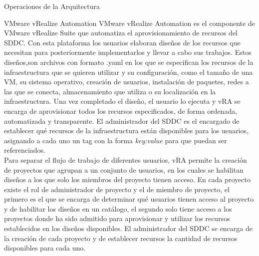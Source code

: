 \begin{subsection}{Operaciones de la Arquitectura}
    \begin{subsubsection}{VMware vRealize Automation}
        VMware vRealize Automation es el componente de VMware vRealize Suite que automatiza el aprovisionamiento de recursos del SDDC. Con esta plataforma los usuarios elaboran diseños de los recursos que necesitan para posteriormente implementarlos y llevar a cabo sus trabajos. Estos diseños,son archivos con formato .yaml en los que se especifican los recursos de la infraestructura que se quieren utilizar y su configuración, como el tamaño de una VM, su sistema operativo, creación de usuarios, instalación de paquetes, redes a las que se conecta, almacenamiento que utiliza o su localización en la infraestructura. Una vez completado el diseño, el usuario lo ejecuta y vRA se encarga de aprovisionar todos los recursos especificados, de forma ordenada, automatizada y transparente. El administrador del SDDC es el encargado de establecer qué recursos de la infraestructura están disponibles para los usuarios, asignando a cada uno un tag con la forma \textit{key:value} para que puedan ser referenciados.
        \\        
        Para separar el flujo de trabajo de diferentes usuarios, vRA permite la creación de proyectos que agrupan a un conjunto de usuarios, en los cuales se habilitan diseños a los que solo los miembros del proyecto tienen acceso. En cada proyecto existe el rol de administrador de proyecto y el de miembro de proyecto, el primero es el que se encarga de determinar qué usuarios tienen acceso al proyecto y de habilitar los diseños en un catálogo, el segundo solo tiene acceso a los proyectos donde ha sido admitido para aprovisionar y utilizar los recursos establecidos en los diseños disponibles. El administrador del SDDC se encarga de la creación de cada proyecto y de establecer recursos la cantidad de recursos disponibles para cada uno.

\end{subsubsection}
\end{subsection}

